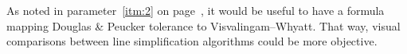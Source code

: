 \documentclass[a4paper]{article}
\newcommand{\DP}{Douglas \& Peucker}
\newcommand{\VW}{Visvalingam--Whyatt}
\begin{document}
As noted in parameter~\ref{itm:2} on page~\pageref{itm:2}, it would be useful
to have a formula mapping {\DP} tolerance to {\VW}. That way, visual
comparisons between line simplification algorithms could be more objective.


\printbibliography

\end{document}
